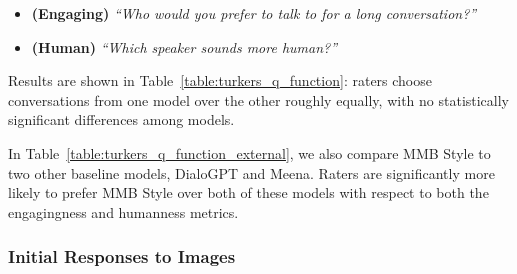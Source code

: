 \documentclass[11pt,a4paper]{article}
\begin{document}
\begin{itemize}
  \item \textbf{(Engaging)} \textit{``Who would you prefer to talk to for a long conversation?''}
  \item \textbf{(Human)} \textit{``Which speaker sounds more human?''}
\end{itemize}

Results are shown in Table~\ref{table:turkers_q_function}: raters choose conversations from one model over the other roughly equally, with no statistically significant differences among models. 

In Table~\ref{table:turkers_q_function_external}, we also compare MMB Style to two other baseline models, DialoGPT and Meena. Raters are significantly more likely to prefer MMB Style over both of these models with respect to both the engagingness and humanness metrics.

\subsubsection{Initial Responses to Images}
\label{sec:human_eval_image_response}
\end{document}
